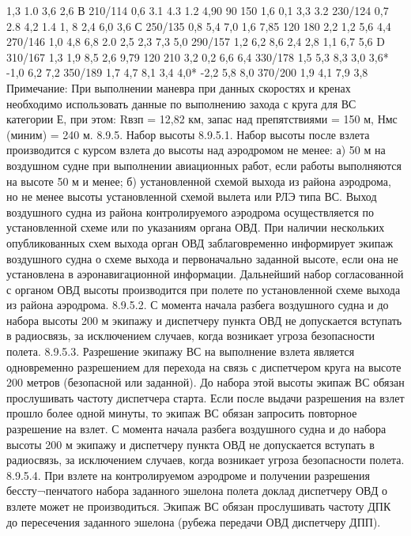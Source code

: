 										
										
										
		1,3	1.0	3,6	2,6					
В	210/114	0,6	3.1	4.3	1.2	4,90	90	150		
		1,6	0,1	3,3	3.2					
	230/124	0,7	2.8	4,2	1.4					
		1, 8	2,4	6,0	3,6					
С	250/135	0,8	5,4	7,0	1,6	7,85	120	180		
		2,2	1,2	5,6	4,4					
	270/146	1,0	4,8	6,8	2.0					
		2,5	2,3	7,3	5,0					
	290/157	1,2	6,2	8,6	2,4					
		2,8	1,1	6,7	5,6					
D	310/167	1,3	1,9	8,5	2,6	9,79	120	210		
		3,2	0,2	6,6	6,4					
	330/178	1,5	5,3	8,3	3,0					
		3,6*	-1,0	6,2	7,2					
	350/189	1,7	4,7	8,1	3,4					
		4,0*	-2,2	5,8	8,0					
	370/200	1,9	4,1	7,9	3,8					
Примечание: При выполнении маневра при данных скоростях и кренах необходимо использовать данные по выполнению захода с круга для ВС категории Е, при этом:
Rвзп = 12,82 км, запас над препятствиями = 150 м, Нмс (миним) = 240 м.
8.9.5.  Набор высоты
8.9.5.1. Набор высоты после взлета производится с курсом взлета до высоты над аэродромом не менее: 
а)	50 м на воздушном судне при выполнении авиационных работ, если работы выполняются на высоте 50 м и менее; 
б)	установленной схемой выхода из района аэродрома, но не менее высоты установленной схемой вылета или РЛЭ типа ВС.
Выход воздушного судна из района контролируемого аэродрома осуществляется по установленной схеме или по указаниям органа ОВД. 
При наличии нескольких опубликованных схем выхода орган ОВД заблаговременно информирует экипаж воздушного судна о схеме выхода и первоначально заданной высоте, если она не установлена в аэронавигационной информации.
Дальнейший набор согласованной с органом ОВД высоты производится при полете по установленной схеме выхода из района аэродрома.
8.9.5.2. С момента начала разбега воздушного судна и до набора высоты 200 м экипажу и диспетчеру пункта ОВД не допускается вступать в радиосвязь, за исключением случаев, когда возникает угроза безопасности полета.
8.9.5.3. Разрешение экипажу ВС на выполнение взлета является одновременно разрешением для перехода на связь с диспетчером круга на высоте 200 метров (безопасной или заданной). До набора этой высоты экипаж ВС обязан прослушивать частоту диспетчера старта. Если после выдачи разрешения на взлет прошло более одной минуты, то экипаж ВС обязан запросить повторное разрешение на взлет. 
С момента начала разбега воздушного судна и до набора высоты 200 м экипажу и диспетчеру пункта ОВД не допускается вступать в радиосвязь, за исключением случаев, когда возникает угроза безопасности полета.
8.9.5.4. При взлете на контролируемом аэродроме и получении разрешения бессту¬пенчатого набора заданного эшелона полета доклад диспетчеру ОВД о взлете может не производиться. Экипаж ВС обязан прослушивать частоту ДПК до пересечения заданного эшелона (рубежа передачи ОВД диспетчеру ДПП).
